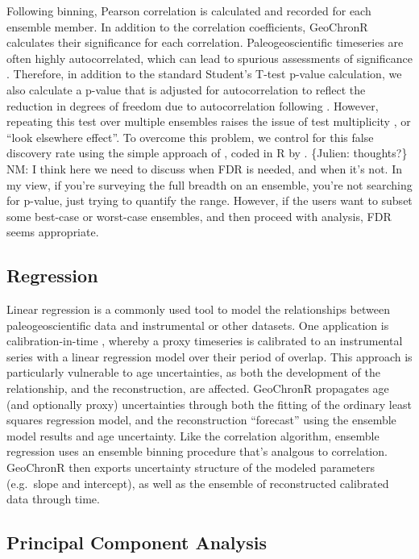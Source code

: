\documentclass[gchron, manuscript]{copernicus}
\begin{document}
Following binning, Pearson correlation is calculated and recorded for each ensemble member.
In addition to the correlation coefficients, GeoChronR calculates their significance for each correlation.
Paleogeoscientific timeseries are often highly autocorrelated, which can lead to spurious assessments of significance \citep{Hu_epsl17}.
Therefore, in addition to the standard Student's T-test p-value calculation, we also calculate a p-value that is adjusted for autocorrelation to reflect the reduction in degrees of freedom due to autocorrelation following \citet{bretherton1999}.
However, repeating this test over multiple ensembles raises the issue of test multiplicity \citep{Ventura2004}, or ``look elsewhere effect''.
To overcome this problem, we control for this false discovery rate using the simple approach of \citet{BenjaminiHochberg95}, coded in R by \citet{Ventura2004}.
\{Julien: thoughts?\} NM: I think here we need to discuss when FDR is needed, and when it's not. In my view, if you're surveying the full breadth on an ensemble, you're not searching for p-value, just trying to quantify the range. However, if the users want to subset some best-case or worst-case ensembles, and then proceed with analysis, FDR seems appropriate.

\subsection{Regression}

Linear regression is a commonly used tool to model the relationships between paleogeoscientific data and instrumental or other datasets.
One application is calibration-in-time \citep{grosjean2009calibration}, whereby a proxy timeseries is calibrated to an instrumental series with a linear regression model over their period of overlap.
This approach is particularly vulnerable to age uncertainties, as both the development of the relationship, and the reconstruction, are affected.
GeoChronR propagates age (and optionally proxy) uncertainties through both the fitting of the ordinary least squares regression model, and the reconstruction ``forecast'' using the ensemble model results and age uncertainty.
Like the correlation algorithm, ensemble regression uses an ensemble binning procedure that's analgous to correlation.
GeoChronR then exports uncertainty structure of the modeled parameters (e.g.~slope and intercept), as well as the ensemble of reconstructed calibrated data through time.

\subsection{Principal Component Analysis}
\end{document}
